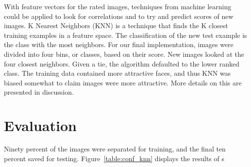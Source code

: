 \documentclass[10pt,twocolumn,letterpaper]{article}
\begin{document}
 With feature vectors for the rated images, techniques from machine learning could be applied to look for correlations and 
 to try and predict scores of new images. K Nearest Neighbors (KNN) is a technique that finds the K closest training examples in a feature space. The classification of the new test example is the class with the most neighbors. For our final implementation, images were divided into four bins, or classes, based on their score. New images looked at the four closest neighbors. Given a tie, the algorithm defaulted to the lower ranked class. The training data contained more attractive faces, and thus KNN was biased somewhat to claim images were more attractive. More details on this are presented in discussion.

\section{Evaluation}

Ninety percent of the images were separated for training, and the final ten percent saved for testing. Figure~\ref{table:conf_knn} displays the results of s
\end{document}
